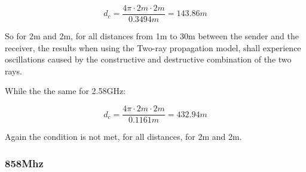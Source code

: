 \begin{equation}
d_{c} = \frac{4\pi \cdot 2m \cdot 2m}{0.3494m} = 143.86m
\label{critical_fac_dc_calc_2_2_858MHz}
\end{equation}

So for 2m and 2m, for all distances from 1m to 30m between the sender and the receiver, the results when using the Two-ray propagation model, shall experience oscillations caused by the constructive and destructive combination of the two rays.

While the the same for 2.58GHz:

\begin{equation}
d_{c} = \frac{4\pi \cdot 2m \cdot 2m}{0.1161m} = 432.94m
\label{critical_fac_dc_calc_2_2_2.58GHz}
\end{equation}

Again the condition is not met, for all distances, for 2m and 2m.









\subsubsection{858Mhz}

